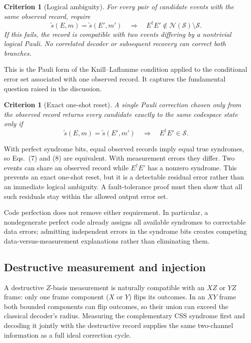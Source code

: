 \documentclass[11pt]{article}
\newtheorem{criterion}[definition]{Criterion}
\theoremstyle{remark}
\newcommand{\cS}{\mathcal S}
\newcommand{\cN}{\mathcal N}
\begin{document}
\begin{criterion}[Logical ambiguity]
For every pair of candidate events with the same observed record, require
\[
 \widetilde s(E,m)=\widetilde s(E',m')
 \quad\Longrightarrow\quad
 E^\dagger E'\notin\cN(\cS)\setminus\cS.
 \tag{7}
\]
If this fails, the record is compatible with two events differing by a
nontrivial logical Pauli.  No correlated decoder or subsequent recovery can
correct both branches.
\end{criterion}

This is the Pauli form of the Knill--Laflamme condition applied to the
conditional error set associated with one observed record.  It captures the
fundamental question raised in the discussion.

\begin{criterion}[Exact one-shot reset]
A single Pauli correction chosen only from the observed record returns every
candidate exactly to the same codespace state only if
\[
 \widetilde s(E,m)=\widetilde s(E',m')
 \quad\Longrightarrow\quad E^\dagger E'\in\cS.
 \tag{8}
\]
\end{criterion}

With perfect syndrome bits, equal observed records imply equal true
syndromes, so Eqs.~(7) and (8) are equivalent.  With measurement errors they
differ.  Two events can share an observed record while $E^\dagger E'$ has a
nonzero syndrome.  This prevents an exact one-shot reset, but it is a
detectable residual error rather than an immediate logical ambiguity.  A
fault-tolerance proof must then show that all such residuals stay within the
allowed output error set.

Code perfection does not remove either requirement.  In particular, a
nondegenerate perfect code already assigns all available syndromes to
correctable data errors; admitting independent errors in the syndrome bits
creates competing data-versus-measurement explanations rather than
eliminating them.

\subsection{Destructive measurement and injection}

A destructive $Z$-basis measurement is naturally compatible with an $XZ$
or $YZ$ frame: only one frame component ($X$ or $Y$) flips its outcomes.  In
an $XY$ frame both bounded components can flip outcomes, so their union can
exceed the classical decoder's radius.  Measuring the complementary CSS
syndrome first and decoding it jointly with the destructive record supplies
the same two-channel information as a full ideal correction cycle.
\end{document}
